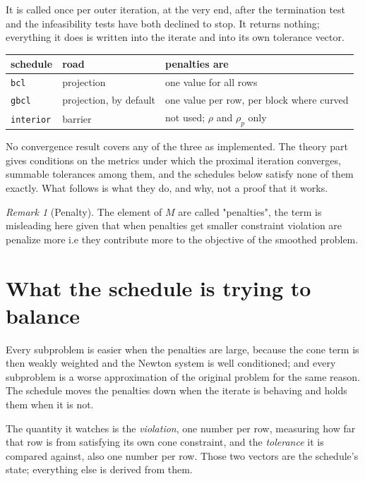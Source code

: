 \documentclass[a4paper,11pt]{book}
\theoremstyle{plain}
\theoremstyle{definition}
\theoremstyle{remark}
\newtheorem{remark}[theorem]{Remark}
\numberwithin{equation}{chapter}
\numberwithin{algorithm}{chapter}
\begin{document}
	It is called once per outer iteration, at the very end, after the termination
	test and the infeasibility tests have both declined to stop. It returns
	nothing; everything it does is written into the iterate and into its own
	tolerance vector.

	\begin{table}[H]
		\centering\small
		\begin{tabular}{lll}
			\toprule
			schedule & road & penalties are\\
			\midrule
			\texttt{bcl} & projection & one value for all rows\\
			\texttt{gbcl} & projection, by default & one value per row, per block
			where curved\\
			\texttt{interior} & barrier & not used; $\rho$ and $\rho_p$ only\\
			\bottomrule
		\end{tabular}
	\end{table}

	No convergence result covers any of the three as implemented. The theory part
	gives conditions on the metrics under which the proximal iteration converges,
	summable tolerances among them, and the schedules below satisfy none of them
	exactly. What follows is what they do, and why, not a proof that it works.

    \begin{remark}[Penalty]
    	The element of $M$ are called "penalties", the term is misleading here given that when penalties get smaller constraint violation are penalize more i.e they contribute more to the objective of the smoothed problem. 
    \end{remark}

	\section{What the schedule is trying to balance}
	Every subproblem is easier when the penalties are large, because the cone term
	is then weakly weighted and the Newton system is well conditioned; and every
	subproblem is a worse approximation of the original problem for the same
	reason. The schedule moves the penalties down when the iterate is behaving
	and holds them when it is not.

	The quantity it watches is the \emph{violation}, one number per row, measuring
	how far that row is from satisfying its own cone constraint, and the
	\emph{tolerance} it is compared against, also one number per row. Those two
	vectors are the schedule's state; everything else is derived from them.
\end{document}
